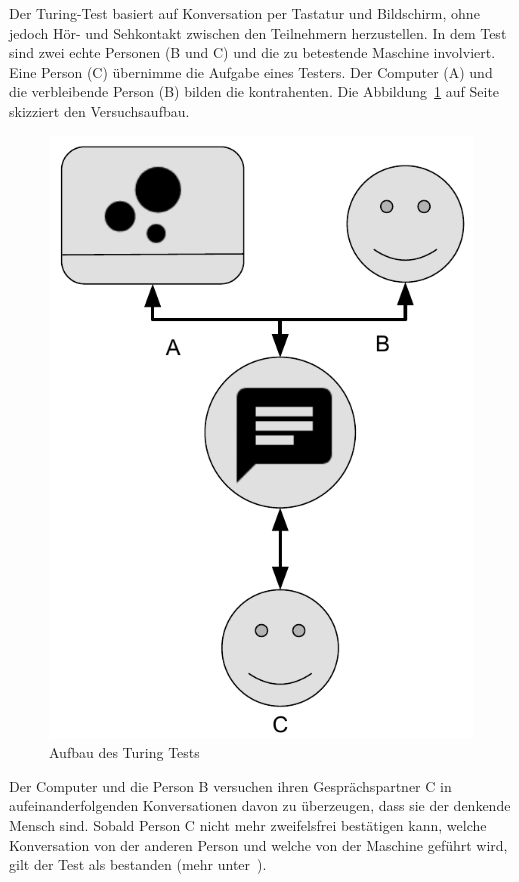 Der Turing-Test basiert auf Konversation per Tastatur und Bildschirm, ohne jedoch Hör- und Sehkontakt zwischen den
Teilnehmern herzustellen. In dem Test sind zwei echte Personen (B und C) und die zu betestende Maschine involviert. Eine
Person (C) übernimme die Aufgabe eines Testers. Der Computer (A) und die verbleibende Person (B) bilden die kontrahenten.
Die Abbildung~\ref{fig:grundlagen_turingtest} auf Seite~\pageref{fig:grundlagen_turingtest} skizziert den Versuchsaufbau.

\begin{figure}[h]
    \centering
    \includegraphics[scale=0.6]{images/kapitel_2/turing_test.pdf}
    \caption{Aufbau des Turing Tests}
    \label{fig:grundlagen_turingtest}
\end{figure}

Der Computer und die Person B versuchen ihren Gesprächspartner C in aufeinanderfolgenden Konversationen davon zu
überzeugen, dass sie der denkende Mensch sind. Sobald Person C nicht mehr zweifelsfrei bestätigen kann, welche Konversation
von der anderen Person und welche von der Maschine geführt wird, gilt der Test als bestanden (mehr
unter~\cite{online_grundlagen_turing}).

